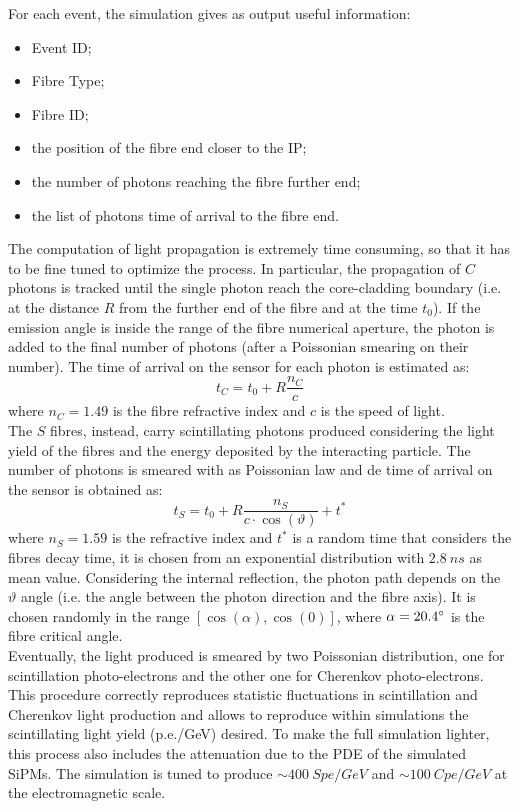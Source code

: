 For each event, the simulation gives as output useful information: 
\begin{itemize}
	\item Event ID;
	\item Fibre Type;
	\item Fibre ID;
	\item the position of the fibre end closer to the IP;
	\item the number of photons reaching the fibre further end;
	\item the list of photons time of arrival to the fibre end.
\end{itemize}

The computation of light propagation is extremely time consuming, so that it has to be fine tuned to optimize the process. In particular, the propagation of $C$ photons is tracked until the single photon reach the core-cladding boundary (i.e. at the distance $R$ from the further end of the fibre and at the time $t_0$). If the emission angle is inside the range of the fibre numerical aperture, the photon is added to the final number of photons (after a Poissonian smearing on their number).
The time of arrival on the sensor for each photon is estimated as:
\begin{equation}
t_C = t_0 + R \frac{n_C}{c}
\end{equation}
where $n_C = 1.49$ is the fibre refractive index and $c$ is the speed of light.\\

The $S$ fibres, instead, carry scintillating photons produced considering the light yield of the fibres and the energy deposited by the interacting particle. The number of photons is smeared with as Poissonian law and de time of arrival on the sensor is obtained as:
\begin{equation}
	t_S = t_0 + R\frac{n_S}{c\cdot \cos(\vartheta)} + t^*
\end{equation}
where $n_S = 1.59$ is the refractive index and $t^*$ is a random time that considers the fibres decay time, it is chosen from an exponential distribution with $2.8\ ns$ as mean value.
Considering the internal reflection, the photon path depends on the $\vartheta$ angle (i.e. the angle between the photon direction and the fibre axis). It is chosen randomly in the range $[\cos(\alpha),\cos(0)]$, where $\alpha = 20.4\degree$ is the fibre critical angle.\\
Eventually, the light produced is smeared by two Poissonian distribution, one for scintillation photo-electrons and the other one for Cherenkov photo-electrons. This procedure correctly reproduces statistic fluctuations in scintillation and Cherenkov light production and allows to reproduce within simulations the scintillating light yield (p.e./GeV) desired. To make the full simulation lighter, this process also includes the attenuation due to the PDE of the simulated SiPMs. The simulation is tuned to produce $\sim 400\ Spe/GeV$ and $\sim 100\ Cpe/GeV$ at the electromagnetic scale.

